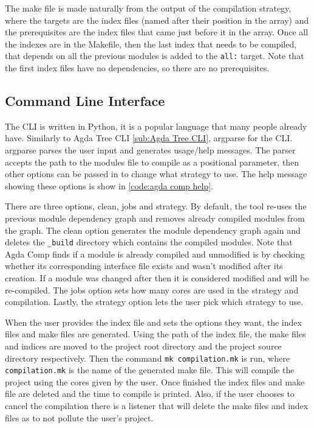 The make file is made naturally from the output of the compilation strategy,
where the targets are the index files (named after their position in the array)
and the prerequisites are the index files that came just before it in the
array. Once all the indexes are in the Makefile, then the last index that needs
to be compiled, that depends on all the previous modules is added to the
\texttt{all:} target. Note that the first index files have no dependencies, so
there are no prerequisites.


\subsection{Command Line Interface}

The CLI is written in Python, it is a popular language
that many people already have. Similarly to Agda Tree CLI \cref{sub:Agda Tree
CLI}, argparse for the CLI. argparse parses the user input and generates
usage/help messages. The parser accepts the path to the modules file to compile
as a positional parameter, then other options can be passed in to change what
strategy to use. The help message showing these options is show in
\cref{code:agda comp help}.

There are three options, clean, jobs and strategy. By default, the tool re-uses
the previous module dependency graph and removes already compiled modules from
the graph. The clean option generates the module dependency graph again and
deletes the \texttt{\_build} directory which contains the compiled modules.
Note that Agda Comp finds if a module is already compiled and unmodified is by
checking whether its corresponding interface file exists and wasn't modified
after its creation. If a module was changed after then it is considered
modified and will be re-compiled. The jobs option sets how many cores are used
in the strategy and compilation. Lastly, the strategy option lets the user pick
which strategy to use.

When the user provides the index file and sets the options they want, the index
files and make files are generated. Using the path of the index file, the make
files and indices are moved to the project root directory and the project
source directory respectively. Then the command \texttt{mk compilation.mk} is
run, where \texttt{compilation.mk} is the name of the generated make file. This
will compile the project using the cores given by the user. Once finished the
index files and make file are deleted and the time to compile is printed. Also,
if the user chooses to cancel the compilation there is a listener that will
delete the make files and index files as to not pollute the user's project.

